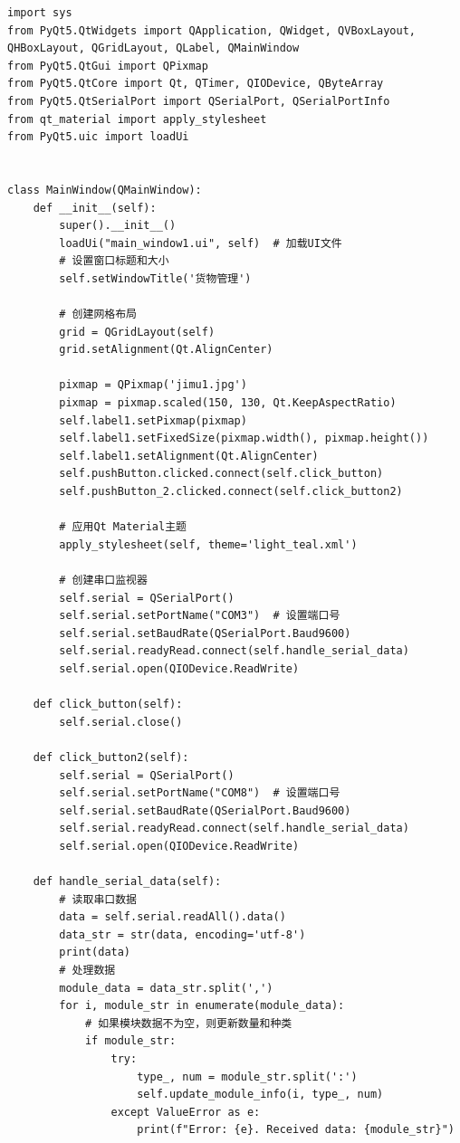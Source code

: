 \documentclass{article}
\begin{document}
\begin{lstlisting}
import sys
from PyQt5.QtWidgets import QApplication, QWidget, QVBoxLayout, QHBoxLayout, QGridLayout, QLabel, QMainWindow
from PyQt5.QtGui import QPixmap
from PyQt5.QtCore import Qt, QTimer, QIODevice, QByteArray
from PyQt5.QtSerialPort import QSerialPort, QSerialPortInfo
from qt_material import apply_stylesheet
from PyQt5.uic import loadUi


class MainWindow(QMainWindow):
    def __init__(self):
        super().__init__()
        loadUi("main_window1.ui", self)  # 加载UI文件
        # 设置窗口标题和大小
        self.setWindowTitle('货物管理')

        # 创建网格布局
        grid = QGridLayout(self)
        grid.setAlignment(Qt.AlignCenter)

        pixmap = QPixmap('jimu1.jpg')
        pixmap = pixmap.scaled(150, 130, Qt.KeepAspectRatio)
        self.label1.setPixmap(pixmap)
        self.label1.setFixedSize(pixmap.width(), pixmap.height())
        self.label1.setAlignment(Qt.AlignCenter)
        self.pushButton.clicked.connect(self.click_button)
        self.pushButton_2.clicked.connect(self.click_button2)

        # 应用Qt Material主题
        apply_stylesheet(self, theme='light_teal.xml')

        # 创建串口监视器
        self.serial = QSerialPort()
        self.serial.setPortName("COM3")  # 设置端口号
        self.serial.setBaudRate(QSerialPort.Baud9600)
        self.serial.readyRead.connect(self.handle_serial_data)
        self.serial.open(QIODevice.ReadWrite)

    def click_button(self):
        self.serial.close()

    def click_button2(self):
        self.serial = QSerialPort()
        self.serial.setPortName("COM8")  # 设置端口号
        self.serial.setBaudRate(QSerialPort.Baud9600)
        self.serial.readyRead.connect(self.handle_serial_data)
        self.serial.open(QIODevice.ReadWrite)

    def handle_serial_data(self):
        # 读取串口数据
        data = self.serial.readAll().data()
        data_str = str(data, encoding='utf-8')
        print(data)
        # 处理数据
        module_data = data_str.split(',')
        for i, module_str in enumerate(module_data):
            # 如果模块数据不为空，则更新数量和种类
            if module_str:
                try:
                    type_, num = module_str.split(':')
                    self.update_module_info(i, type_, num)
                except ValueError as e:
                    print(f"Error: {e}. Received data: {module_str}")


\end{lstlisting}
\end{document}
